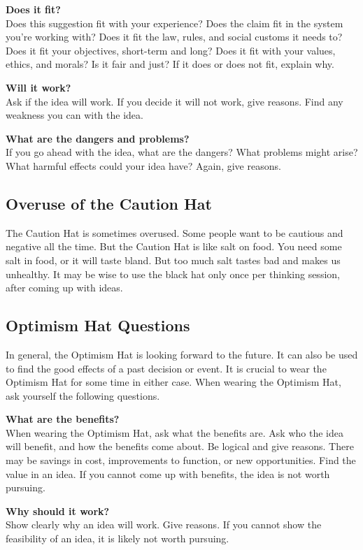 \textbf{Does it fit?} \\
Does this suggestion fit with your experience? Does the claim fit in the system you're working with? Does it fit the law, rules, and social customs it needs to? Does it fit your objectives, short-term and long? Does it fit with your values, ethics, and morals? Is it fair and just? If it does or does not fit, explain why.

\textbf{Will it work?} \\
Ask if the idea will work. If you decide it will not work, give reasons. Find any weakness you can with the idea.

\textbf{What are the dangers and problems?} \\
If you go ahead with the idea, what are the dangers? What problems might arise? What harmful effects could your idea have? Again, give reasons.

\subsection*{Overuse of the Caution Hat}
The Caution Hat is sometimes overused. Some people want to be cautious and negative all the time. But the Caution Hat is like salt on food. You need some salt in food, or it will taste bland. But too much salt tastes bad and makes us unhealthy.
It may be wise to use the black hat only once per thinking session, after coming up with ideas.

\subsection*{Optimism Hat Questions}
In general, the Optimism Hat is looking forward to the future. It can also be used to find the good effects of a past decision or event. It is crucial to wear the Optimism Hat for some time in either case.
When wearing the Optimism Hat, ask yourself the following questions.

\textbf{What are the benefits?} \\
When wearing the Optimism Hat, ask what the benefits are. Ask who the idea will benefit, and how the benefits come about. Be logical and give reasons. There may be savings in cost, improvements to function, or new opportunities. Find the value in an idea. If you cannot come up with benefits, the idea is not worth pursuing.

\textbf{Why should it work?} \\
Show clearly why an idea will work. Give reasons. If you cannot show the feasibility of an idea, it is likely not worth pursuing.


